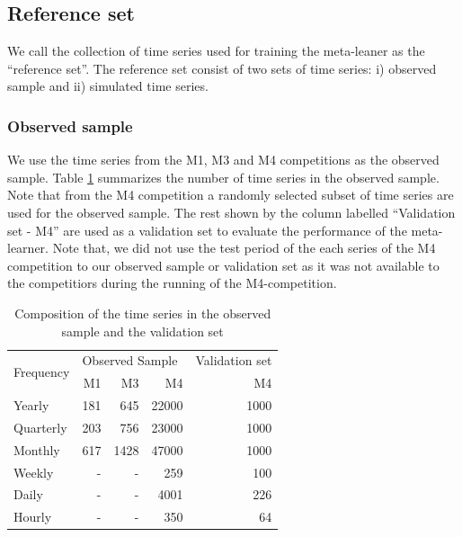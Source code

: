 \documentclass[11pt,a4paper,]{article}
\begin{document}
\hypertarget{reference-set}{%
\subsection{Reference set}\label{reference-set}}

We call the collection of time series used for training the meta-leaner as the ``reference set''. The reference set consist of two sets of time series: i) observed sample and ii) simulated time series.

\hypertarget{observed-sample}{%
\subsubsection{Observed sample}\label{observed-sample}}

We use the time series from the M1, M3 and M4 competitions as the observed sample. Table \ref{observedsample} summarizes the number of time series in the observed sample. Note that from the M4 competition a randomly selected subset of time series are used for the observed sample. The rest shown by the column labelled ``Validation set - M4'' are used as a validation set to evaluate the performance of the meta-learner. Note that, we did not use the test period of the each series of the M4 competition to our observed sample or validation set as it was not available to the competitiors during the running of the M4-competition.

\begin{table}[!h]
\centering
\caption{Composition of the time series in the observed sample and the validation set}
\label{observedsample}
\begin{tabular}{l|rrr|r}
\multirow{2}{*}{Frequency} & \multicolumn{3}{l|}{Observed Sample} & Validation set \\
&   M1    &    M3   &    M4 & M4 \\ \hline
Yearly          &   181    &   645    &   22000 & 1000 \\
Quarterly       &   203    &    756   &   23000 & 1000\\
Monthly         &   617    &    1428   &  47000 & 1000\\
Weekly          &   -    &   -    &   259 & 100\\
Daily           &   -    &   -    &   4001 & 226\\
Hourly          &   -    &    -   &  350 & 64\\ \hline
\end{tabular}
\end{table}
\end{document}

